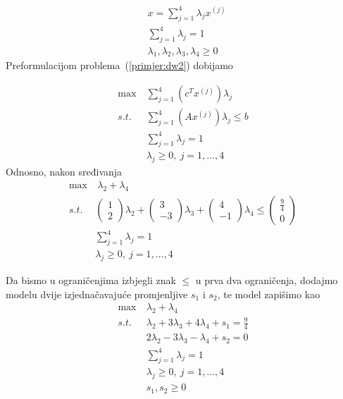 \documentclass[a4paper, utf8, 11pt, colorlinks]{book}
\begin{document}
$$\begin{aligned}
&x = \sum_{j=1}^4\lambda_j x^{(j)}\\
&\sum_{j=1}^4\lambda_j=1\\
&\lambda_1,\lambda_2,\lambda_3,\lambda_4\geqslant 0
\end{aligned}$$
 Preformulacijom problema~(\ref{primjer:dw2}) dobijamo
 
     \begin{equation}
 	\begin{aligned}\label{primjer:dw3}
 		\max\  & \sum_{j=1}^4(c^T  x^{(j)})\lambda_j\\
 		s.t.\  &\sum_{j=1}^4 (A  x^{(j)})\lambda_j\leqslant b\\
 		&\sum_{j=1}^4\lambda_j = 1\\
 		&\lambda_j\geqslant 0,\ j = 1,\ldots,4
 	\end{aligned}
 \end{equation}
 Odnosno, nakon sređivanja 
      \begin{equation}
 	\begin{aligned}\label{primjer:dw4}
 		\max  &\  \lambda_2+\lambda_4\\
 		s.t.\  &\left(\begin{array}{c}
 			1\\
 			2
 		\end{array}\right)\lambda_2+\left(\begin{array}{c}
 		3\\
 		-3
 	\end{array}\right)\lambda_3+\left(\begin{array}{c}
 	4\\
 	-1
 \end{array}\right)\lambda_4\leqslant \left(\begin{array}{c}
 			\frac 9 4\\
 			0
 		\end{array}\right)\\
 		&\sum_{j=1}^4\lambda_j = 1\\
 		&\lambda_j\geqslant 0,\ j = 1,\ldots,4
 	\end{aligned}
 \end{equation}

Da bismo u ograničenjima izbjegli znak $\leqslant$ u prva dva ograničenja, dodajmo modelu dvije izjednačavajuće promjenljive $s_1$ i $s_2$, te model zapišimo kao
      \begin{equation}
	\begin{aligned}\label{primjer:dw5}
		\max\  & \lambda_2+\lambda_4\\
		s.t.\  &\lambda_2+3\lambda_3+4\lambda_4+s_1=\frac 94\\
		&2\lambda_2-3\lambda_3-\lambda_4+s_2=0\\
		&\sum_{j=1}^4\lambda_j = 1\\
		&\lambda_j\geqslant 0,\ j = 1,\ldots,4\\
		&s_1,s_2\geqslant 0
	\end{aligned}
\end{equation}
\end{document}
